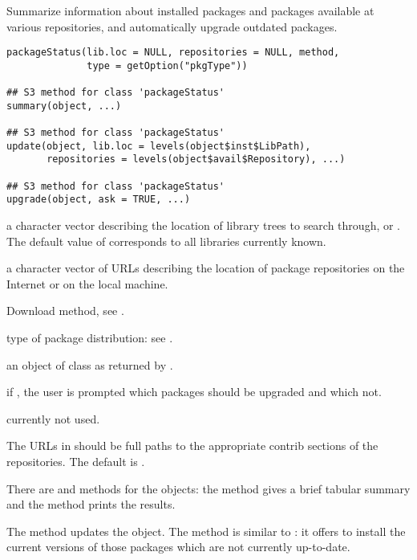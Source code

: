 %
\begin{Description}\relax
Summarize information about installed packages and packages
available at various repositories, and automatically upgrade outdated
packages.
\end{Description}
%
\begin{Usage}
\begin{verbatim}
packageStatus(lib.loc = NULL, repositories = NULL, method,
              type = getOption("pkgType"))

## S3 method for class 'packageStatus'
summary(object, ...)

## S3 method for class 'packageStatus'
update(object, lib.loc = levels(object$inst$LibPath),
       repositories = levels(object$avail$Repository), ...)

## S3 method for class 'packageStatus'
upgrade(object, ask = TRUE, ...)
\end{verbatim}
\end{Usage}
%
\begin{Arguments}
\begin{ldescription}
\item[\code{lib.loc}] a character vector describing the location of \R{}
library trees to search through, or .  The default value
of  corresponds to all libraries currently known.
\item[\code{repositories}] a character vector of URLs describing the location of \R{}
package repositories on the Internet or on the local machine.
\item[\code{method}] Download method, see .
\item[\code{type}] type of package distribution:
see .
\item[\code{object}] an object of class  as returned by
.
\item[\code{ask}] if , the user is prompted which packages should
be upgraded and which not.
\item[\code{...}] currently not used.
\end{ldescription}
\end{Arguments}
%
\begin{Details}\relax
The URLs in  should be full paths to the
appropriate contrib sections of the repositories.  The default is
.

There are  and  methods for the
 objects: the  method gives a brief
tabular summary and the  method prints the results.

The  method updates the  object.
The  method is similar to :
it offers to install the current versions of those packages which are not
currently up-to-date.
\end{Details}
